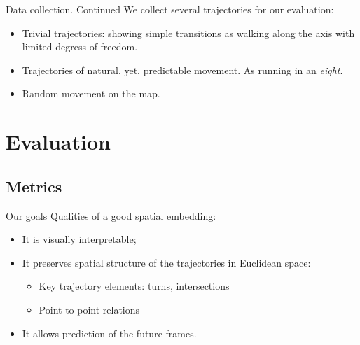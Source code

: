 \documentclass[pdftex]{beamer}
\begin{document}
\begin{frame}{Data collection. Continued}
  We collect several trajectories for our evaluation:
  \begin{itemize}
    \item Trivial trajectories: showing simple transitions as walking along the axis with limited degress of freedom.
    \item Trajectories of natural, yet, predictable movement. As running in an \textit{eight}.
    \item Random movement on the map.
  \end{itemize}
\end{frame}






\section{Evaluation}

\subsection{Metrics}

\begin{frame}{Our goals}
  Qualities of a good spatial embedding:
  \begin{itemize}
    \item It is visually interpretable;
    \item It preserves spatial structure of the trajectories in Euclidean space:
      \begin{itemize}
        \item Key trajectory elements: turns, intersections
        \item Point-to-point relations
      \end{itemize}
    \item It allows prediction of the future frames.
  \end{itemize}
\end{frame}
\end{document}
